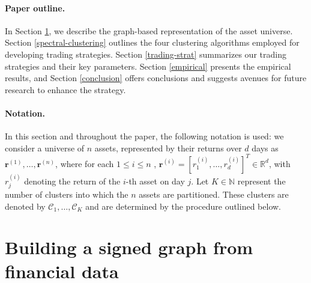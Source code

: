 \documentclass[sigconf]{acmart}
\begin{document}
\paragraph{\textbf{Paper outline.}} In Section \ref{building-graph}, we describe the graph-based representation of the asset universe. Section \ref{spectral-clustering} outlines the four clustering algorithms employed for developing trading strategies. Section \ref{trading-strat} summarizes our trading strategies and their key parameters. Section \ref{empirical} presents the empirical results, and Section \ref{conclusion} offers conclusions and suggests avenues for future research to enhance the strategy.

\paragraph{\textbf{Notation}.} 
In this section and throughout the paper, the following notation is used: we consider a universe of $n$ assets, represented by their returns over $d$ days as $\mathbf{r}^{(1)}, \ldots, \mathbf{r}^{(n)}$, where for each $1 \leq i \leq n$ ,  $\mathbf{r}^{(i)} = [ r^{(i)}_1, \ldots, r^{(i)}_d ]^T \in \mathbb{R}^d$, with $r^{(i)}_j$ denoting the return of the $i$-th asset on day $j$. Let $K \in \mathbb{N}$ represent the number of clusters into which the $n$ assets are partitioned. These clusters are denoted by $\mathcal{C}_1, \ldots, \mathcal{C}_K$ and are determined by the procedure outlined below.


\section{Building a signed graph from financial data}
\label{building-graph}
\end{document}
